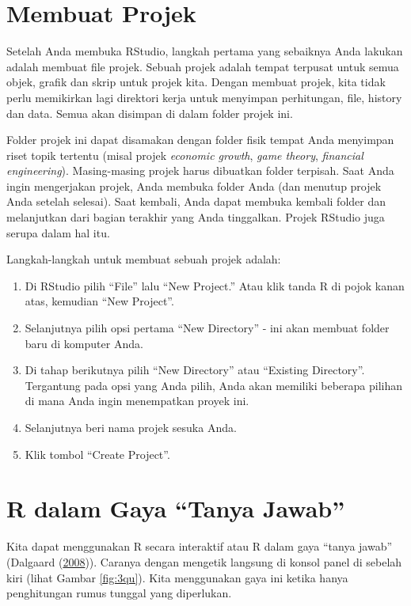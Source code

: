 \documentclass[a4paper, nobind]{templates/ociamthesis}
\providecommand{\tightlist}{%
  \setlength{\itemsep}{0pt}\setlength{\parskip}{0pt}}
\begin{document}
\hypertarget{membuat-projek}{%
\section{Membuat Projek}\label{membuat-projek}}

Setelah Anda membuka RStudio, langkah pertama yang sebaiknya Anda lakukan adalah membuat file projek. Sebuah projek adalah tempat terpusat untuk semua objek, grafik dan skrip untuk projek kita. Dengan membuat projek, kita tidak perlu memikirkan lagi direktori kerja untuk menyimpan perhitungan, file, history dan data. Semua akan disimpan di dalam folder projek ini.

Folder projek ini dapat disamakan dengan folder fisik tempat Anda menyimpan riset topik tertentu (misal projek \emph{economic growth}, \emph{game theory}, \emph{financial engineering}). Masing-masing projek harus dibuatkan folder terpisah. Saat Anda ingin mengerjakan projek, Anda membuka folder Anda (dan menutup projek Anda setelah selesai). Saat kembali, Anda dapat membuka kembali folder dan melanjutkan dari bagian terakhir yang Anda tinggalkan. Projek RStudio juga serupa dalam hal itu.

Langkah-langkah untuk membuat sebuah projek adalah:

\begin{enumerate}
\def\labelenumi{\arabic{enumi}.}
\tightlist
\item
  Di RStudio pilih ``File'' lalu ``New Project.'' Atau klik tanda R di pojok kanan atas, kemudian ``New Project''.
\item
  Selanjutnya pilih opsi pertama ``New Directory'' - ini akan membuat folder baru di komputer Anda.
\item
  Di tahap berikutnya pilih ``New Directory'' atau ``Existing Directory''. Tergantung pada opsi yang Anda pilih, Anda akan memiliki beberapa pilihan di mana Anda ingin menempatkan proyek ini.
\item
  Selanjutnya beri nama projek sesuka Anda.
\item
  Klik tombol ``Create Project''.
\end{enumerate}

\hypertarget{r-dalam-gaya-tanya-jawab}{%
\section{R dalam Gaya ``Tanya Jawab''}\label{r-dalam-gaya-tanya-jawab}}

Kita dapat menggunakan R secara interaktif atau R dalam gaya ``tanya jawab'' (Dalgaard (\protect\hyperlink{ref-dalgaardIntroductoryStatistics2008}{2008})). Caranya dengan mengetik langsung di konsol panel di sebelah kiri (lihat Gambar \ref{fig:3qu}). Kita menggunakan gaya ini ketika hanya penghitungan rumus tunggal yang diperlukan.
\end{document}
